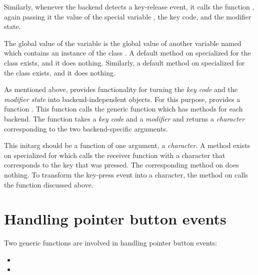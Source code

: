 Similarly, whenever the backend detects a key-release event, it calls
the function , again passing it the value of
the special variable , the key code, and the
modifier state.

The global value of the variable  is the global
value of another variable named  which
contains an instance of the class .  A default
method on  specialized for the
 class exists, and it does nothing.  Similarly,
a default method on  specialized for the
 class exists, and it does nothing.

As mentioned above, \clim{} provides functionality for turning the
\emph{key code} and the \emph{modifier state} into backend-independent
objects.  For this purpose, \clim{} provides a function
.  This function calls the generic
function  which has methods for each
backend.  The function  takes a \emph{key
  code} and a \emph{modifier} and returns a \cl{} \emph{character}
corresponding to the two backend-specific arguments. 



This initarg should be a function of one
argument, a \emph{character}.  A method exists on
 specialized for 
which calls the receiver function with a character that corresponds to
the key that was pressed.  The corresponding method on
 does nothing.  To transform the key-press
event into a character, the method on  calls
the function  discussed above.

\section{Handling pointer button events}

Two generic functions are involved in handling pointer button events:

\begin{itemize}
\item {}
\item {}
\end{itemize}

